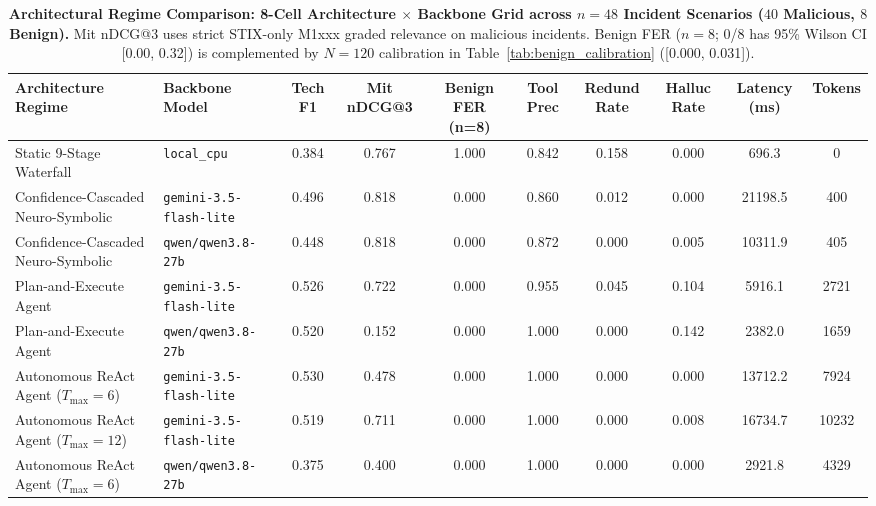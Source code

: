 \begin{table}[t]
\centering
\small
\caption{\textbf{Architectural Regime Comparison: 8-Cell Architecture $\times$ Backbone Grid across $n=48$ Incident Scenarios ($40$ Malicious, $8$ Benign).} Mit nDCG@3 uses strict STIX-only M1xxx graded relevance on malicious incidents. Benign FER ($n=8$; 0/8 has 95\% Wilson CI [0.00, 0.32]) is complemented by $N=120$ calibration in Table~\ref{tab:benign_calibration} ([0.000, 0.031]).}
\label{tab:agentic_comparison}
\begin{tabular}{llcccccccc}
\toprule
\textbf{Architecture Regime} & \textbf{Backbone Model} & \textbf{Tech F1} & \textbf{Mit nDCG@3} & \textbf{Benign FER (n=8)} & \textbf{Tool Prec} & \textbf{Redund Rate} & \textbf{Halluc Rate} & \textbf{Latency (ms)} & \textbf{Tokens} \\
\midrule
Static 9-Stage Waterfall & \texttt{local\_cpu} & 0.384 & 0.767 & 1.000 & 0.842 & 0.158 & 0.000 & 696.3 & 0 \\
Confidence-Cascaded Neuro-Symbolic & \texttt{gemini-3.5-flash-lite} & 0.496 & 0.818 & 0.000 & 0.860 & 0.012 & 0.000 & 21198.5 & 400 \\
Confidence-Cascaded Neuro-Symbolic & \texttt{qwen/qwen3.8-27b} & 0.448 & 0.818 & 0.000 & 0.872 & 0.000 & 0.005 & 10311.9 & 405 \\
Plan-and-Execute Agent & \texttt{gemini-3.5-flash-lite} & 0.526 & 0.722 & 0.000 & 0.955 & 0.045 & 0.104 & 5916.1 & 2721 \\
Plan-and-Execute Agent & \texttt{qwen/qwen3.8-27b} & 0.520 & 0.152 & 0.000 & 1.000 & 0.000 & 0.142 & 2382.0 & 1659 \\
Autonomous ReAct Agent ($T_{\max}=6$) & \texttt{gemini-3.5-flash-lite} & 0.530 & 0.478 & 0.000 & 1.000 & 0.000 & 0.000 & 13712.2 & 7924 \\
Autonomous ReAct Agent ($T_{\max}=12$) & \texttt{gemini-3.5-flash-lite} & 0.519 & 0.711 & 0.000 & 1.000 & 0.000 & 0.008 & 16734.7 & 10232 \\
Autonomous ReAct Agent ($T_{\max}=6$) & \texttt{qwen/qwen3.8-27b} & 0.375 & 0.400 & 0.000 & 1.000 & 0.000 & 0.000 & 2921.8 & 4329 \\
\bottomrule
\end{tabular}
\end{table}
